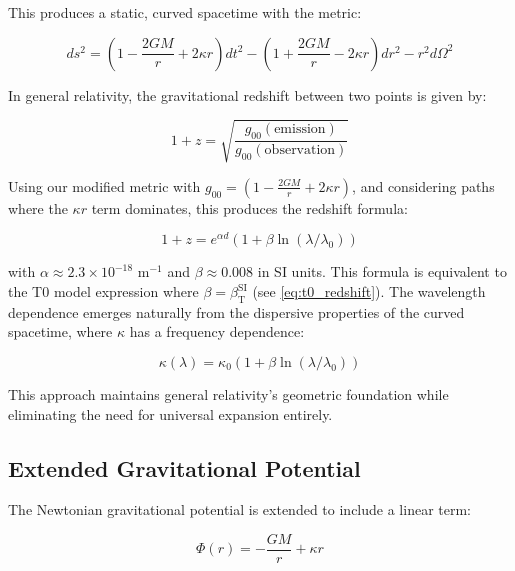 \documentclass[12pt,a4paper]{article}
\newcommand{\betaT}{\beta_{\text{T}}}
\begin{document}
	This produces a static, curved spacetime with the metric\cite{pascher_galaxies_2025}:
	
	\begin{equation}
		\label{eq:modified_metric}
		ds^2 = (1 - \frac{2GM}{r} + 2\kappa r)dt^2 - (1 + \frac{2GM}{r} - 2\kappa r)dr^2 - r^2d\Omega^2
	\end{equation}
	
	In general relativity, the gravitational redshift between two points is given by\cite{weinberg1972}:
	
	\begin{equation}
		\label{eq:grav_redshift}
		1 + z = \sqrt{\frac{g_{00}(\text{emission})}{g_{00}(\text{observation})}}
	\end{equation}
	
	Using our modified metric with $g_{00} = (1 - \frac{2GM}{r} + 2\kappa r)$, and considering paths where the $\kappa r$ term dominates, this produces the redshift formula\cite{pascher_messdifferenzen_2025}:
	
	\begin{equation}
		\label{eq:extended_redshift}
		1 + z = e^{\alpha d}(1 + \beta \ln(\lambda/\lambda_0))
	\end{equation}
	
	with $\alpha \approx 2.3\times10^{-18}$ m$^{-1}$ and $\beta \approx 0.008$ in SI units. This formula is equivalent to the T0 model expression where $\beta = \betaT^{\text{SI}}$ (see \cref{eq:t0_redshift}). The wavelength dependence emerges naturally from the dispersive properties of the curved spacetime, where $\kappa$ has a frequency dependence\cite{pascher_temp_2025}:
	
	\begin{equation}
		\label{eq:kappa_wavelength}
		\kappa(\lambda) = \kappa_0(1 + \beta \ln(\lambda/\lambda_0))
	\end{equation}
	
	This approach maintains general relativity's geometric foundation while eliminating the need for universal expansion entirely.
	
	\subsection{Extended Gravitational Potential}
	\label{sec:extended_gravity}
	
	The Newtonian gravitational potential is extended to include a linear term\cite{pascher_galaxies_2025}:
	
	\begin{equation}
		\label{eq:extended_potential}
		\Phi(r) = -\frac{GM}{r} + \kappa r
	\end{equation}
	
\end{document}
